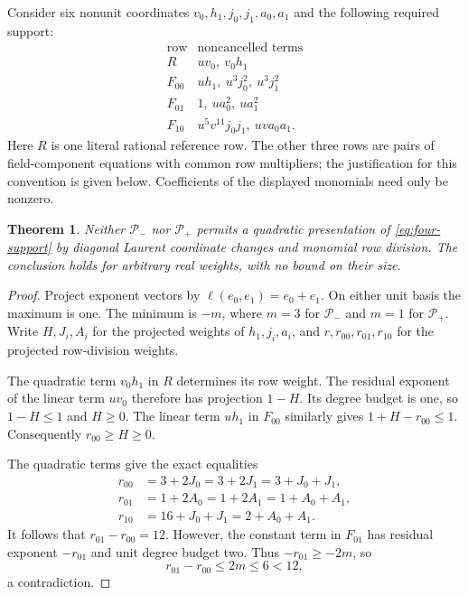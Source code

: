 \documentclass[11pt,a4paper]{article}
\newtheorem{theorem}{Theorem}[section]
\begin{document}
Consider six nonunit coordinates $v_0,h_1,j_0,j_1,a_0,a_1$ and
the following required support:
\begin{equation}\label{eq:four-support}
\begin{array}{c|l}
\text{row}&\text{noncancelled terms}\\\hline
R&uv_0,\ v_0h_1\\
F_{00}&uh_1,\ u^3j_0^2,\ u^3j_1^2\\
F_{01}&1,\ ua_0^2,\ ua_1^2\\
F_{10}&u^5v^{11}j_0j_1,\ uv a_0a_1.
\end{array}
\end{equation}
Here $R$ is one literal rational reference row. The other three
rows are pairs of field-component equations with common row
multipliers; the justification for this convention is given below.
Coefficients of the displayed monomials need only be nonzero.

\begin{theorem}\label{thm:reference}
Neither $\mathcal P_-$ nor $\mathcal P_+$ permits a quadratic
presentation of \eqref{eq:four-support} by diagonal Laurent
coordinate changes and monomial row division. The conclusion
holds for arbitrary real weights, with no bound on their size.
\end{theorem}
\begin{proof}
Project exponent vectors by $\ell(e_0,e_1)=e_0+e_1$. On either
unit basis the maximum is one. The minimum is $-m$, where $m=3$
for $\mathcal P_-$ and $m=1$ for $\mathcal P_+$.
Write $H,J_i,A_i$ for the projected weights of $h_1,j_i,a_i$, and
$r,r_{00},r_{01},r_{10}$ for the projected row-division weights.

The quadratic term $v_0h_1$ in $R$ determines its row weight.
The residual exponent of the linear term $uv_0$ therefore has
projection $1-H$. Its degree budget is one, so $1-H\le1$ and
$H\ge0$. The linear term $uh_1$ in $F_{00}$ similarly gives
$1+H-r_{00}\le1$. Consequently $r_{00}\ge H\ge0$.

The quadratic terms give the exact equalities
\[
\begin{aligned}
r_{00}&=3+2J_0=3+2J_1=3+J_0+J_1,\\
r_{01}&=1+2A_0=1+2A_1=1+A_0+A_1,\\
r_{10}&=16+J_0+J_1=2+A_0+A_1.
\end{aligned}
\]
It follows that $r_{01}-r_{00}=12$. However, the constant term in
$F_{01}$ has residual exponent $-r_{01}$ and unit degree budget
two. Thus $-r_{01}\ge-2m$, so
\[
                    r_{01}-r_{00}\le2m\le6<12,
\]
a contradiction.
\end{proof}
\end{document}
